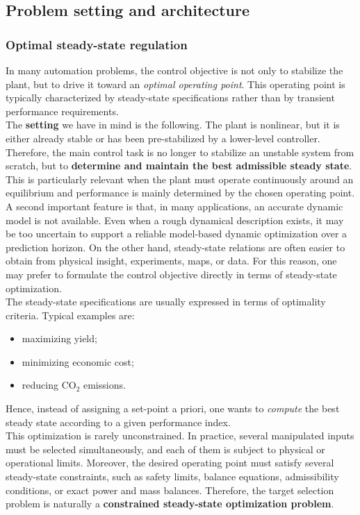 \subsection{Problem setting and architecture}
\subsubsection{Optimal steady-state regulation}

In many automation problems, the control objective is not only to stabilize the plant, but to drive it toward an \emph{optimal operating point}. This operating point is typically characterized by steady-state specifications rather than by transient performance requirements.\\

The \textbf{setting} we have in mind is the following. The plant is nonlinear, but it is either already stable or has been pre-stabilized by a lower-level controller. Therefore, the main control task is no longer to stabilize an unstable system from scratch, but to \textbf{determine and maintain the best admissible steady state}. This is particularly relevant when the plant must operate continuously around an equilibrium and performance is mainly determined by the chosen operating point.\\

A second important feature is that, in many applications, an accurate dynamic model is not available. Even when a rough dynamical description exists, it may be too uncertain to support a reliable model-based dynamic optimization over a prediction horizon. On the other hand, steady-state relations are often easier to obtain from physical insight, experiments, maps, or data. For this reason, one may prefer to formulate the control objective directly in terms of steady-state optimization.\\
The steady-state specifications are usually expressed in terms of optimality criteria. Typical examples are:
\begin{itemize}
    \item maximizing yield;
    \item minimizing economic cost;
    \item reducing $\mathrm{CO}_2$ emissions.
\end{itemize}
Hence, instead of assigning a set-point a priori, one wants to \emph{compute} the best steady state according to a given performance index.\\

This optimization is rarely unconstrained. In practice, several manipulated inputs must be selected simultaneously, and each of them is subject to physical or operational limits. Moreover, the desired operating point must satisfy several steady-state constraints, such as safety limits, balance equations, admissibility conditions, or exact power and mass balances. Therefore, the target selection problem is naturally a \textbf{constrained steady-state optimization problem}.\\

